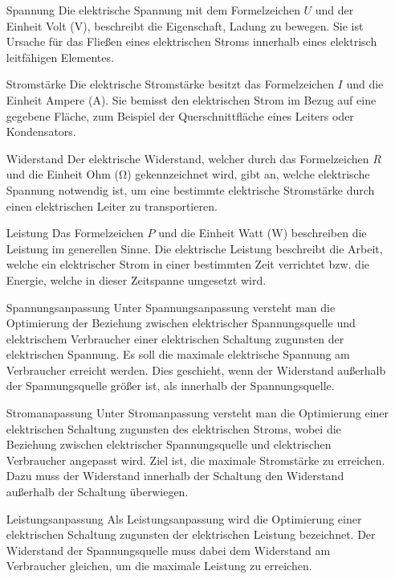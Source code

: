 \documentclass{article}
\begin{document}
    \begin{itemize}
        \item[Spannung]
        Die elektrische Spannung mit dem Formelzeichen $U$ und der Einheit Volt ($\si{\volt}$), beschreibt die Eigenschaft, Ladung zu bewegen.
        Sie ist Ursache für das Fließen eines elektrischen Stroms innerhalb eines elektrisch leitfähigen Elementes.
        \item[Stromstärke]
        Die elektrische Stromstärke besitzt das Formelzeichen $I$ und die Einheit Ampere ($\si{\ampere}$).
        Sie bemisst den elektrischen Strom im Bezug auf eine gegebene Fläche, zum Beispiel der Querschnittfläche eines Leiters oder Kondensators.
        \item[Widerstand]
        Der elektrische Widerstand, welcher durch das Formelzeichen $R$ und die Einheit Ohm ($\si{\ohm}$) gekennzeichnet wird, gibt an, welche elektrische Spannung notwendig ist, um eine bestimmte elektrische Stromstärke durch einen elektrischen Leiter zu transportieren.
        \item[Leistung]
        Das Formelzeichen $P$ und die Einheit Watt ($\si{\watt}$) beschreiben die Leistung im generellen Sinne.
        Die elektrische Leistung beschreibt die Arbeit, welche ein elektrischer Strom in einer bestimmten Zeit verrichtet bzw. die Energie, welche in dieser Zeitspanne umgesetzt wird.
        \item[Spannungsanpassung]
        Unter Spannungsanpassung versteht man die Optimierung der Beziehung zwischen elektrischer Spannungsquelle und elektrischem Verbraucher einer elektrischen Schaltung zugunsten der elektrischen Spannung.
        Es soll die maximale elektrische Spannung am Verbraucher erreicht werden.
        Dies geschieht, wenn der Widerstand außerhalb der Spannungsquelle größer ist, als innerhalb der Spannungsquelle.
        \item[Stromanapassung]
        Unter Stromanpassung versteht man die Optimierung einer elektrischen Schaltung zugunsten des elektrischen Stroms, wobei die Beziehung zwischen elektrischer Spannungsquelle und elektrischen Verbraucher angepasst wird.
        Ziel ist, die maximale Stromstärke zu erreichen.
        Dazu muss der Widerstand innerhalb der Schaltung den Widerstand außerhalb der Schaltung überwiegen.
        \item[Leistungsanpassung]
        Als Leistungsanpassung wird die Optimierung einer elektrischen Schaltung zugunsten der elektrischen Leistung bezeichnet.
        Der Widerstand der Spannungsquelle muss dabei dem Widerstand am Verbraucher gleichen, um die maximale Leistung zu erreichen.
    \end{itemize}
\end{document}
